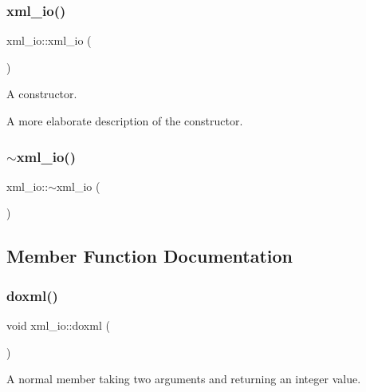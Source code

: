 \subsubsection{\texorpdfstring{xml\+\_\+io()}{xml\_io()}}
{\footnotesize\ttfamily xml\+\_\+io\+::xml\+\_\+io (\begin{DoxyParamCaption}{ }\end{DoxyParamCaption})}



A constructor. 

A more elaborate description of the constructor. \mbox{\label{classxml__io_a01c56d514f2a24f0c7358526498c4a07}} 
\subsubsection{\texorpdfstring{$\sim$xml\+\_\+io()}{~xml\_io()}}
{\footnotesize\ttfamily xml\+\_\+io\+::$\sim$xml\+\_\+io (\begin{DoxyParamCaption}{ }\end{DoxyParamCaption})}



\subsection{Member Function Documentation}
\mbox{\label{classxml__io_a3af0b8b55bb5146eaabab1d22c906040}} 
\subsubsection{\texorpdfstring{doxml()}{doxml()}}
{\footnotesize\ttfamily void xml\+\_\+io\+::doxml (\begin{DoxyParamCaption}{ }\end{DoxyParamCaption})\hspace{0.3cm}{\ttfamily [static]}}



A normal member taking two arguments and returning an integer value. 

\mbox{\label{classxml__io_a5daa3b87de561ed5147cc6c12b578eb3}} 
